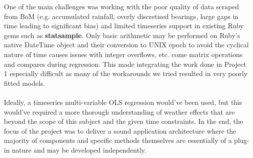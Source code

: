 \documentclass[10pt]{article}
\begin{document}
\noindent One of the main challenges was working with the poor quality of data scraped from BoM (e.g. accumulated rainfall, overly discretised bearings, large gaps in time leading to significant bias) and limited timeseries support in existing Ruby gems such as \textbf{statsample}. Only basic arithmetic may be performed on Ruby's native DateTime object and their conversion to UNIX epoch to avoid the cyclical nature of time causes issues with integer overflows, etc. come matrix operations and compares during regression. This made integrating the work done in Project 1 especially difficult as many of the workarounds we tried resulted in very poorly fitted models. \\\\
Ideally, a timeseries multi-variable OLS regression would've been used, but this would've required a more thorough understanding of weather effects that are beyond the scope of this subject and the given time constraints. In the end, the focus of the project was to deliver a sound application architecture where the majority of components and specific methods themselves are essentially of a plug-in nature and may be developed independently.
\end{document}
